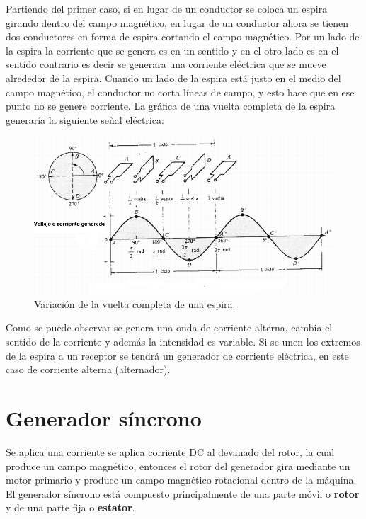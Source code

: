 \documentclass[11pt]{article}
\begin{document}
\noindent
Partiendo del primer caso, si en lugar de un conductor se coloca un espira girando dentro del campo magnético, en lugar de un conductor ahora se tienen dos conductores en forma de espira cortando el campo magnético. Por un lado de la espira la corriente que se genera es en un sentido y en el otro lado es en el sentido contrario es decir se generara una corriente eléctrica que se mueve alrededor de la espira. Cuando un lado de la espira está justo en el medio del campo magnético, el conductor no corta líneas de campo, y esto hace que en ese punto no se genere corriente. La gráfica de una vuelta completa de la espira generaría la siguiente señal eléctrica:
\begin{figure}[H]
  \centering
  \includegraphics[scale=0.7]{image.png}
    \caption{Variación de la vuelta completa de una espira.}
  \label{fig3}
\end{figure}
\noindent
Como se puede observar se genera una onda de corriente alterna, cambia el sentido de la corriente y además la intensidad es variable. Si se unen los extremos de la espira a un receptor se tendrá un generador de corriente eléctrica, en este caso de corriente alterna (alternador).

\section{Generador síncrono}
\noindent
Se aplica una corriente se aplica corriente DC al devanado del rotor, la cual produce un campo magnético, entonces el rotor del generador gira mediante un motor primario y produce un campo magnético rotacional dentro de la máquina.\\
El generador síncrono está compuesto principalmente de una parte móvil o \textbf{rotor} y de una parte fija o \textbf{estator}.
\end{document}
